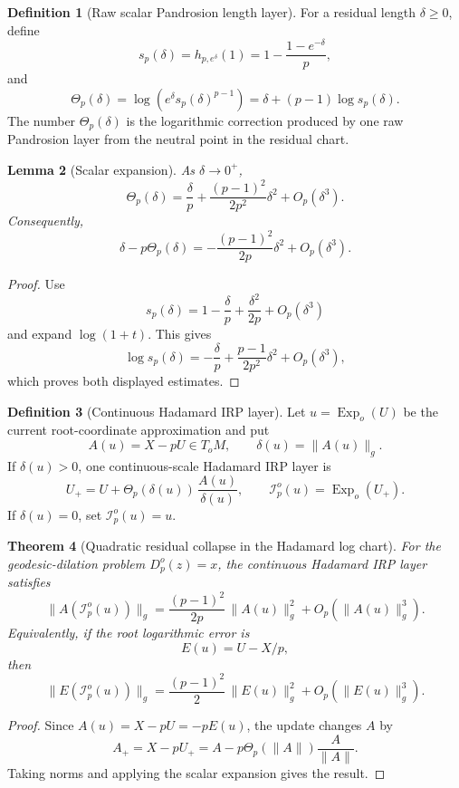 \documentclass[10pt,a4paper]{article}
\theoremstyle{plain}
\newtheorem{theorem}{Theorem}[section]
\newtheorem{lemma}[theorem]{Lemma}
\theoremstyle{definition}
\newtheorem{definition}[theorem]{Definition}
\theoremstyle{remark}
\newcommand{\Exp}{\operatorname{Exp}}
\newcommand{\IRP}{\mathcal I}
\begin{document}
\begin{definition}[Raw scalar Pandrosion length layer]
For a residual length $\delta\ge0$, define
\[
  s_p(\delta)
    =h_{p,e^\delta}(1)
    =1-\frac{1-e^{-\delta}}{p},
\]
and
\[
  \Theta_p(\delta)
    =\log\!\left(e^\delta s_p(\delta)^{p-1}\right)
    =\delta+(p-1)\log s_p(\delta).
\]
The number $\Theta_p(\delta)$ is the logarithmic correction produced by one raw
Pandrosion layer from the neutral point in the residual chart.
\end{definition}

\begin{lemma}[Scalar expansion]
As $\delta\to0^+$,
\[
  \Theta_p(\delta)
    =\frac{\delta}{p}
      +\frac{(p-1)^2}{2p^2}\delta^2
      +O_p(\delta^3).
\]
Consequently,
\[
  \delta-p\Theta_p(\delta)
    =-\frac{(p-1)^2}{2p}\delta^2+O_p(\delta^3).
\]
\end{lemma}

\begin{proof}
Use
\[
  s_p(\delta)=1-\frac{\delta}{p}+\frac{\delta^2}{2p}+O_p(\delta^3)
\]
and expand $\log(1+t)$.  This gives
\[
  \log s_p(\delta)
    =-\frac{\delta}{p}
      +\frac{p-1}{2p^2}\delta^2
      +O_p(\delta^3),
\]
which proves both displayed estimates.
\end{proof}

\begin{definition}[Continuous Hadamard IRP layer]
Let $u=\Exp_o(U)$ be the current root-coordinate approximation and put
\[
  A(u)=X-pU\in T_oM,\qquad \delta(u)=\|A(u)\|_g.
\]
If $\delta(u)>0$, one continuous-scale Hadamard IRP layer is
\[
  U_+
    =U+\Theta_p(\delta(u))\,\frac{A(u)}{\delta(u)},
  \qquad
  \IRP_p^o(u)=\Exp_o(U_+).
\]
If $\delta(u)=0$, set $\IRP_p^o(u)=u$.
\end{definition}

\begin{theorem}[Quadratic residual collapse in the Hadamard log chart]
For the geodesic-dilation problem $D_p^o(z)=x$, the continuous Hadamard IRP layer
satisfies
\[
  \|A(\IRP_p^o(u))\|_g
    =\frac{(p-1)^2}{2p}\,\|A(u)\|_g^2
      +O_p(\|A(u)\|_g^3).
\]
Equivalently, if the root logarithmic error is
\[
  E(u)=U-X/p,
\]
then
\[
  \|E(\IRP_p^o(u))\|_g
    =\frac{(p-1)^2}{2}\,\|E(u)\|_g^2
      +O_p(\|E(u)\|_g^3).
\]
\end{theorem}

\begin{proof}
Since $A(u)=X-pU=-pE(u)$, the update changes $A$ by
\[
  A_+
    =X-pU_+
    =A-p\Theta_p(\|A\|)\frac{A}{\|A\|}.
\]
Taking norms and applying the scalar expansion gives the result.
\end{proof}
\end{document}
